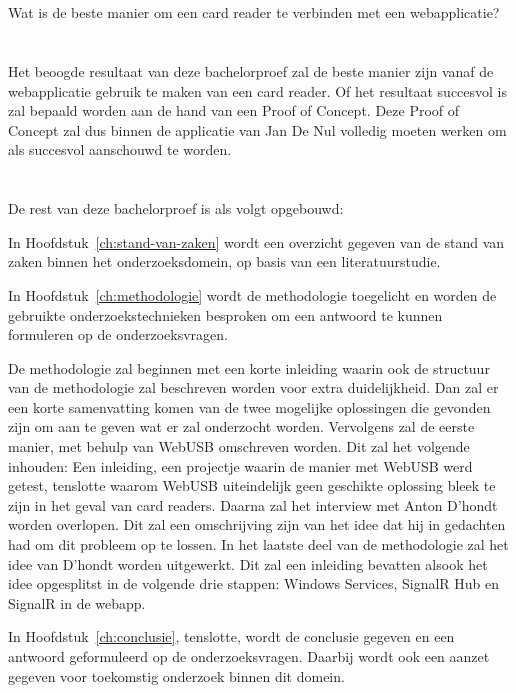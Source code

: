 \section{}%
\label{sec:onderzoeksvraag}
Wat is de beste manier om een card reader te verbinden met een webapplicatie?

\section{}%
\label{sec:onderzoeksdoelstelling}
Het beoogde resultaat van deze bachelorproef zal de beste manier zijn vanaf de webapplicatie gebruik te maken van een card reader. Of het resultaat succesvol is zal bepaald worden aan de hand van een Proof of Concept. Deze Proof of Concept zal dus binnen de applicatie van Jan De Nul volledig moeten werken om als succesvol aanschouwd te worden.


\section{}%
\label{sec:opzet-bachelorproef}


De rest van deze bachelorproef is als volgt opgebouwd:

In Hoofdstuk~\ref{ch:stand-van-zaken} wordt een overzicht gegeven van de stand van zaken binnen het onderzoeksdomein, op basis van een literatuurstudie.

In Hoofdstuk~\ref{ch:methodologie} wordt de methodologie toegelicht en worden de gebruikte onderzoekstechnieken besproken om een antwoord te kunnen formuleren op de onderzoeksvragen.

De methodologie zal beginnen met een korte inleiding waarin ook de structuur van de methodologie zal beschreven worden voor extra duidelijkheid. Dan zal er een korte samenvatting komen van de twee mogelijke oplossingen die gevonden zijn om aan te geven wat er zal onderzocht worden.
Vervolgens zal de eerste manier, met behulp van WebUSB omschreven worden. Dit zal het volgende inhouden: Een inleiding, een projectje waarin de manier met WebUSB werd getest, tenslotte waarom WebUSB uiteindelijk geen geschikte oplossing bleek te zijn in het geval van card readers.
Daarna zal het interview met Anton D'hondt worden overlopen. Dit zal een omschrijving zijn van het idee dat hij in gedachten had om dit probleem op te lossen.
In het laatste deel van de methodologie zal het idee van D'hondt worden uitgewerkt. Dit zal een inleiding bevatten alsook het idee opgesplitst in de volgende drie stappen: Windows Services, SignalR Hub en SignalR in de webapp.

In Hoofdstuk~\ref{ch:conclusie}, tenslotte, wordt de conclusie gegeven en een antwoord geformuleerd op de onderzoeksvragen. Daarbij wordt ook een aanzet gegeven voor toekomstig onderzoek binnen dit domein.